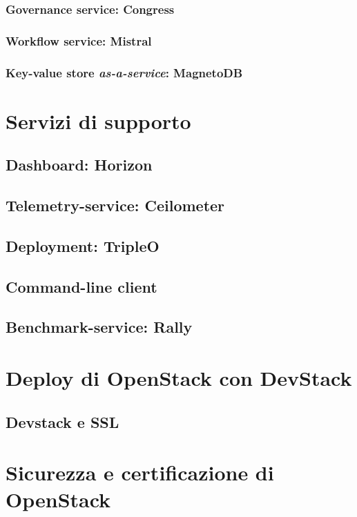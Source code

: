 \subsubsection{Governance service: Congress}
\subsubsection{Workflow service: Mistral}
\subsubsection{Key-value store \textit{as-a-service}: MagnetoDB}

\section{Servizi di supporto}
\subsection{Dashboard: Horizon}
\subsection{Telemetry-service: Ceilometer}
\subsection{Deployment: TripleO}
\subsection{Command-line client}
\subsection{Benchmark-service: Rally}
\section{Deploy di OpenStack con DevStack}
\subsection{Devstack e SSL}
\section{Sicurezza e certificazione di OpenStack}